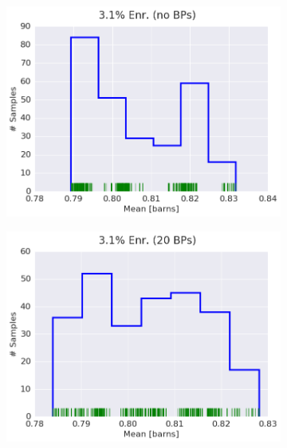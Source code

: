 \begin{figure}[h!]
\centering
\begin{subfigure}{0.5\textwidth}
  \centering
  \includegraphics[width=\linewidth]{figures/patterns/assm-3.1/hist-kde-rug/assm-31-capt-1}
  \caption{}
  \label{fig:chap9-hist-assm-3.1-capt}
\end{subfigure}%
\begin{subfigure}{0.5\textwidth}
  \centering
  \includegraphics[width=\linewidth]{figures/patterns/assm-3.1-20BPs/hist-kde-rug/assm-31-20BPs-capt-1}
  \caption{}
  \label{fig:chap9-hist-assm-3.1-20BPs-capt}
\end{subfigure}
\begin{subfigure}{0.5\textwidth}

\end{subfigure}
\end{figure}
